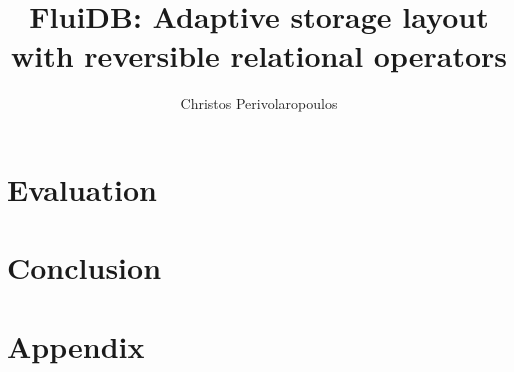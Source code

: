 \documentclass[fontsize=12pt,paper=letter,twosided,cleardoublepage=plain,final]{scrbook}
\title{FluiDB: Adaptive storage layout with reversible relational operators}
\author{Christos Perivolaropoulos}
\begin{document}
\frontmatter


\mainmatter

% 

% 

% 

% 

% 

% 

\chapter{Evaluation}
\label{chapter:evaluation}


\chapter{Conclusion}
\label{chapter:conclusion}


\appendix
\chapter{Appendix}
\label{chapter:appendix}


\begin{spacing}{1}
\printbibliography
\end{spacing}

\backmatter
\end{document}
